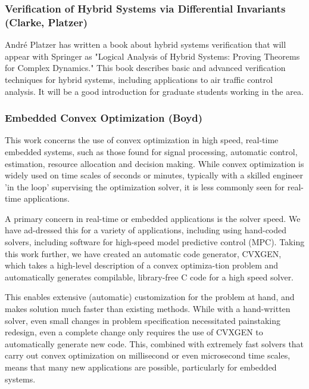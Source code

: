  

 \subsubsection{Verification of Hybrid Systems via Differential Invariants (Clarke, Platzer)}

Andr{\'e} Platzer has written a book about hybrid systems verification that will appear with Springer as "Logical Analysis of Hybrid Systems: Proving Theorems for Complex Dynamics." This book describes basic and advanced verification techniques for hybrid systems, including applications to air traffic control analysis. It will be a good introduction for graduate students working in the area.


\subsubsection{Embedded Convex Optimization (Boyd) }

This work concerns the use of convex optimization in high speed, real-time embedded systems, such as those found for signal processing, automatic control, estimation, resource allocation and decision making. While convex optimization is widely used on time scales of seconds or minutes, typically with a skilled engineer 'in the loop' supervising the optimization solver, it is less commonly seen for real-time applications.

A primary concern in real-time or embedded applications is the solver speed. We have ad-dressed this for a variety of applications, including using hand-coded solvers, including software for high-speed model predictive control (MPC).  Taking this work further, we have created an automatic code generator, CVXGEN, which takes a high-level description of a convex optimiza-tion problem and automatically generates compilable, library-free C code for a high speed solver.

This enables extensive (automatic) customization for the problem at hand, and makes solution much faster than existing methods. While with a hand-written solver, even small changes in problem specification necessitated painstaking redesign, even a complete change only requires the use of CVXGEN to automatically generate new code. This, combined with extremely fast solvers that carry out convex optimization on millisecond or even microsecond time scales, means that many new applications are possible, particularly for embedded systems.

